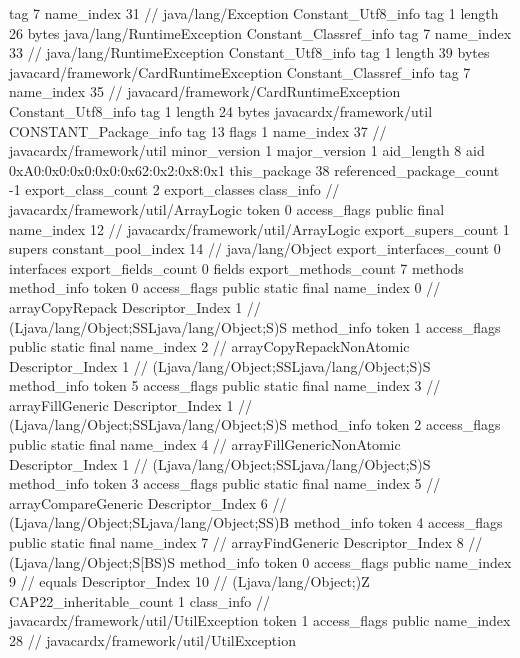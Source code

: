 {{{			tag	7
			name_index	31		// java/lang/Exception
		}
		Constant_Utf8_info {
			tag	1
			length	26
			bytes	java/lang/RuntimeException
		}
		Constant_Classref_info {
			tag	7
			name_index	33		// java/lang/RuntimeException
		}
		Constant_Utf8_info {
			tag	1
			length	39
			bytes	javacard/framework/CardRuntimeException
		}
		Constant_Classref_info {
			tag	7
			name_index	35		// javacard/framework/CardRuntimeException
		}
		Constant_Utf8_info {
			tag	1
			length	24
			bytes	javacardx/framework/util
		}
		CONSTANT_Package_info {
			tag	13
			flags	1
			name_index	37		// javacardx/framework/util
			minor_version	1
			major_version	1
			aid_length	8
			aid	0xA0:0x0:0x0:0x0:0x62:0x2:0x8:0x1
		}
	}
	this_package	38
	referenced_package_count	-1
	export_class_count	2
	export_classes {
		class_info {		// javacardx/framework/util/ArrayLogic
			token	0
			access_flags	public final
			name_index	12		// javacardx/framework/util/ArrayLogic
			export_supers_count	1
			supers {
				constant_pool_index	14		// java/lang/Object
			}
			export_interfaces_count	0
			interfaces {
			}
			export_fields_count	0
			fields {
			}
			export_methods_count	7
			methods {
				method_info {
					token	0
					access_flags	public static final
					name_index	0		// arrayCopyRepack
					Descriptor_Index	1		// (Ljava/lang/Object;SSLjava/lang/Object;S)S
				}
				method_info {
					token	1
					access_flags	public static final
					name_index	2		// arrayCopyRepackNonAtomic
					Descriptor_Index	1		// (Ljava/lang/Object;SSLjava/lang/Object;S)S
				}
				method_info {
					token	5
					access_flags	public static final
					name_index	3		// arrayFillGeneric
					Descriptor_Index	1		// (Ljava/lang/Object;SSLjava/lang/Object;S)S
				}
				method_info {
					token	2
					access_flags	public static final
					name_index	4		// arrayFillGenericNonAtomic
					Descriptor_Index	1		// (Ljava/lang/Object;SSLjava/lang/Object;S)S
				}
				method_info {
					token	3
					access_flags	public static final
					name_index	5		// arrayCompareGeneric
					Descriptor_Index	6		// (Ljava/lang/Object;SLjava/lang/Object;SS)B
				}
				method_info {
					token	4
					access_flags	public static final
					name_index	7		// arrayFindGeneric
					Descriptor_Index	8		// (Ljava/lang/Object;S[BS)S
				}
				method_info {
					token	0
					access_flags	public
					name_index	9		// equals
					Descriptor_Index	10		// (Ljava/lang/Object;)Z
				}
			}
			CAP22_inheritable_count	1
		}
		class_info {		// javacardx/framework/util/UtilException
			token	1
			access_flags	public
			name_index	28		// javacardx/framework/util/UtilException
}}}
